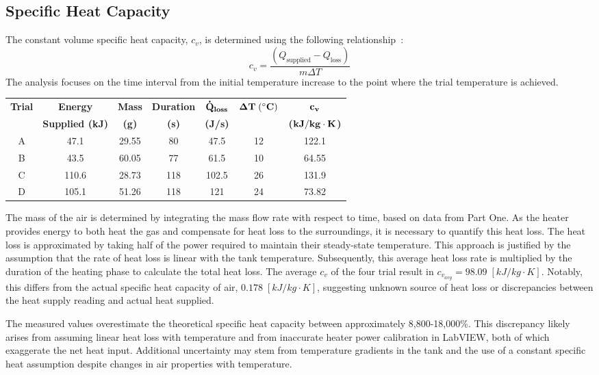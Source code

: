 \documentclass[12pt]{article}
\begin{document}
\subsection*{Specific Heat Capacity}

The constant volume specific heat capacity, \(c_v\), is determined using the following relationship~\cite{che260_manual}:
\[
c_v = \frac{(Q_{\text{supplied}} - Q_{\text{loss}})}{m\Delta T}
\]
The analysis focuses on the time interval from the initial temperature increase to the point where the trial temperature is achieved.

\begin{table}[h!]
\centering
\begin{tabular}{|c|c|c|c|c|c|c|}
\hline
\textbf{Trial} & \textbf{Energy} & \textbf{Mass} & \textbf{Duration} & \textbf{$\bf \dot Q_{loss}$} & \textbf{$\bf \Delta T \; (^{\circ}C)$} & \textbf{$\bf c_v$} \\
& \textbf{Supplied (kJ)} & \textbf{(g)} & \textbf{(s)} & \textbf{(J/s)} &  & \textbf{($\bf kJ/ kg \cdot K$)} \\
\hline
A & 47.1 & 29.55 & 80 & 47.5 & 12 & 122.1 \\
\hline
B & 43.5 & 60.05 & 77 & 61.5 & 10 & 64.55 \\
\hline
C & 110.6 & 28.73 & 118 & 102.5 & 26 & 131.9 \\
\hline
D & 105.1 & 51.26 & 118 & 121 & 24 & 73.82 \\
\hline
\end{tabular}
\end{table}

The mass of the air is determined by integrating the mass flow rate with respect to time, based on data from Part One. As the heater provides energy to both heat the gas and compensate for heat loss to the surroundings, it is necessary to quantify this heat loss. The heat loss is approximated by taking half of the power required to maintain their steady-state temperature. This approach is justified by the assumption that the rate of heat loss is linear with the tank temperature. Subsequently, this average heat loss rate is multiplied by the duration of the heating phase to calculate the total heat loss. The average $c_v$ of the four trial result in $c_{v_{avg}} = 98.09 \; [kJ/ kg \cdot K]$. Notably, this differs from the actual specific heat capacity of air, $0.178 \; [kJ/ kg \cdot K]$, suggesting unknown source of heat loss or discrepancies between the heat supply reading and actual heat supplied.

The measured values overestimate the theoretical specific heat capacity between approximately 8{,}800-18{,}000\%. 
This discrepancy likely arises from assuming linear heat loss with temperature and from 
inaccurate heater power calibration in LabVIEW, both of which exaggerate the net heat input. 
Additional uncertainty may stem from temperature gradients in the tank and the use of a constant 
specific heat assumption despite changes in air properties with temperature.
\end{document}
